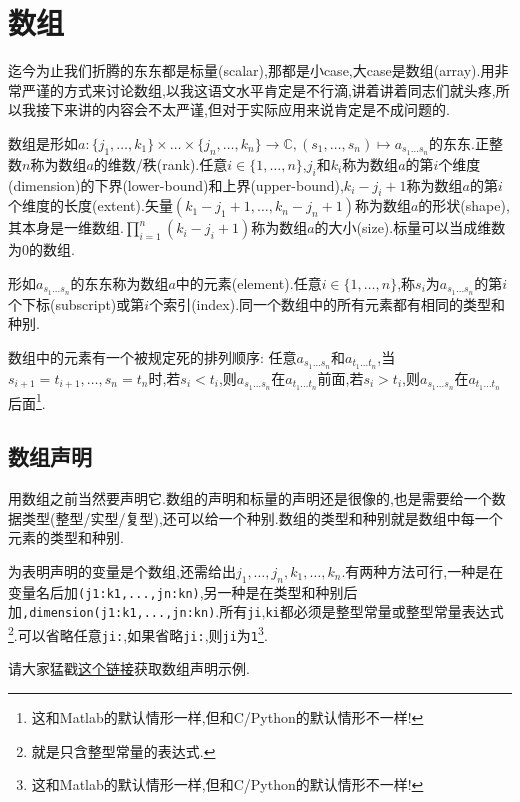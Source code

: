 \chapter{数组}\label{fortran_array}

迄今为止我们折腾的东东都是标量(scalar),那都是小case,大case是数组(array).用非常严谨的方式来讨论数组,以我这语文水平肯定是不行滴,讲着讲着同志们就头疼,所以我接下来讲的内容会不太严谨,但对于实际应用来说肯定是不成问题的.

数组是形如$a\!:\!\{j_1,\dots,k_1\}\!\times\!\dots\!\times\!\{j_n,\dots,k_n\}\rightarrow\mathbb{C},(s_1,\dots,s_n)\mapsto a_{s_1\dots s_n}$的东东.正整数$n$称为数组$a$的维数/秩(rank).任意$i\in\{1,\dots,n\}$,$j_i$和$k_i$称为数组$a$的第$i$个维度(dimension)的下界(lower-bound)和上界(upper-bound),$k_i-j_i+1$称为数组$a$的第$i$个维度的长度(extent).矢量$(k_1-j_1+1,\dots,k_n-j_n+1)$称为数组$a$的形状(shape),其本身是一维数组.$\prod_{i=1}^n(k_i-j_i+1)$称为数组$a$的大小(size).标量可以当成维数为$0$的数组.

形如$a_{s_1\dots s_n}$的东东称为数组$a$中的元素(element).任意$i\in\{1,\dots,n\}$,称$s_i$为$a_{s_1\dots s_n}$的第$i$个下标(subscript)或第$i$个索引(index).同一个数组中的所有元素都有相同的类型和种别.

数组中的元素有一个被规定死的排列顺序: 任意$a_{s_1\dots s_n}$和$a_{t_1\dots t_n}$,当$s_{i+1}=t_{i+1},\dots,s_n=t_n$时,若$s_i<t_i$,则$a_{s_1\dots s_n}$在$a_{t_1\dots t_n}$前面,若$s_i>t_i$,则$a_{s_1\dots s_n}$在$a_{t_1\dots t_n}$后面\footnote{这和Matlab的默认情形一样,但和C/Python的默认情形不一样!}.

\section{数组声明}\label{fortran_array_specification}

用数组之前当然要声明它.数组的声明和标量的声明还是很像的,也是需要给一个数据类型(整型/实型/复型),还可以给一个种别.数组的类型和种别就是数组中每一个元素的类型和种别.

为表明声明的变量是个数组,还需给出$j_1,\dots,j_n,k_1,\dots,k_n$.有两种方法可行,一种是在变量名后加\texttt{(j1:k1,...,jn:kn)},另一种是在类型和种别后加\texttt{,dimension(j1:k1,...,jn:kn)}.所有\texttt{ji},\texttt{ki}都必须是整型常量或整型常量表达式\footnote{
    就是只含整型常量的表达式.
}.可以省略任意\texttt{ji:},如果省略\texttt{ji:},则\texttt{ji}为\texttt{1}\footnote{这和Matlab的默认情形一样,但和C/Python的默认情形不一样!}.

请大家猛戳\href{https://fortran-lang.org/learn/quickstart/arrays_strings#array-declaration}{这个链接}获取数组声明示例.

